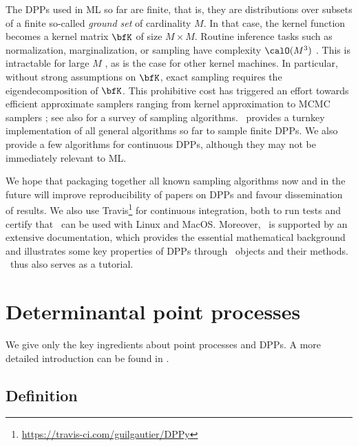 \documentclass[twoside,11pt]{article}
\begin{document}
  The DPPs used in ML so far are finite, that is, they are distributions over subsets of a finite so-called \emph{ground set} of cardinality $M$. In that case, the kernel function becomes a kernel matrix $\bfK$ of size $M\times M$. Routine inference tasks such as normalization, marginalization, or sampling have complexity $\calO(M^3)$ \citep{KuTa12}. This is intractable for large $M$ \citep{Gil14}, as is the case for other kernel machines. In particular, without strong assumptions on $\bfK$, exact sampling requires the eigendecomposition of $\bfK$.
  This prohibitive cost has triggered an effort towards efficient approximate samplers ranging from kernel approximation \citep{AKFT13} to MCMC samplers \citep{AnGhRe16, LiJeSr16c, GaBaVa17}; see also \citep{TrBaAm18} for a survey of sampling algorithms. \DPPy\ provides a turnkey implementation of all general algorithms so far to sample finite DPPs. We also provide a few algorithms for continuous DPPs, although they may not be immediately relevant to ML.

  We hope that packaging together all known sampling algorithms now and in the future will improve reproducibility of papers on DPPs and favour dissemination of results. We also use Travis\footnote{\url{https://travis-ci.com/guilgautier/DPPy}} for continuous integration, both to run tests and certify that \DPPy\ can be used with Linux and MacOS.
  Moreover, \DPPy\ is supported by an extensive documentation, which provides the essential mathematical background and illustrates some key properties of DPPs through \DPPy\ objects and their methods. \DPPy\ thus also serves as a tutorial.


\section{Determinantal point processes} %
\label{sec:determinantal_point_processes}

	We give only the key ingredients about point processes and DPPs. A more detailed introduction can be found in \citep{HKPV06}.

  \subsection{Definition} %
  \label{sub:definition}
\end{document}
